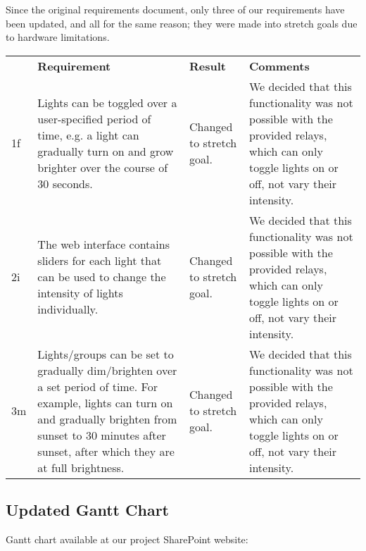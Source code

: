 Since the original requirements document, only three of our requirements have
been updated, and all for the same reason; they were made into stretch goals
due to hardware limitations.

\begin{tabular}{ l p{7cm} p{2cm} p{6cm} }
    & \textbf{Requirement} & \textbf{Result} & \textbf{Comments} \\
    1f & Lights can be toggled over a user-specified period of time, e.g. a light can gradually turn on and grow brighter over the course of 30 seconds. & Changed to stretch goal. & We decided that this functionality was not possible with the provided relays, which can only toggle lights on or off, not vary their intensity.\\
    2i & The web interface contains sliders for each light that can be used to change the intensity of lights individually. & Changed to stretch goal. & We decided that this functionality was not possible with the provided relays, which can only toggle lights on or off, not vary their intensity.\\
    3m & Lights/groups can be set to gradually dim/brighten over a set period of time.  For example, lights can turn on and gradually brighten from sunset to 30 minutes after sunset, after which they are at full brightness. & Changed to stretch goal. & We decided that this functionality was not possible with the provided relays, which can only toggle lights on or off, not vary their intensity.\\
\end{tabular}

\subsection{Updated Gantt Chart}

Gantt chart available at our project SharePoint website:
